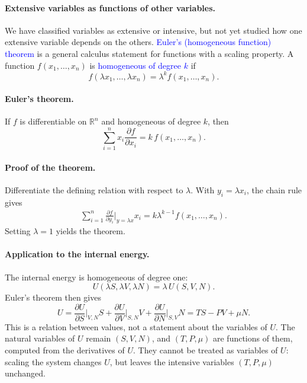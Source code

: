 \paragraph{Extensive variables as functions of other variables.}
We have classified variables as extensive or intensive, but not yet studied
how one extensive variable depends on the others. \textcolor{blue}{Euler's
(homogeneous function) theorem} is a general calculus statement for functions
with a scaling property. A function $f(x_1,\ldots,x_n)$ is
\textcolor{blue}{homogeneous of degree $k$} if
\begin{equation}
    \boxed{f(\lambda x_1,\ldots,\lambda x_n)=\lambda^k f(x_1,\ldots,x_n).}
\end{equation}

\paragraph{Euler's theorem.}
If $f$ is differentiable on $\mathbb{R}^n$ and homogeneous of degree $k$, then
\begin{equation}
    \boxed{\sum_{i=1}^n x_i\frac{\partial f}{\partial x_i}=k\,f(x_1,\ldots,x_n).}
\end{equation}

\paragraph{Proof of the theorem.}
Differentiate the defining relation with respect to $\lambda$. With
$y_i=\lambda x_i$, the chain rule gives
\begin{align*}
    \sum_{i=1}^n\frac{\partial f}{\partial y_i}\bigg|_{y=\lambda x}x_i
    =k\lambda^{k-1}f(x_1,\ldots,x_n).
\end{align*}
Setting $\lambda=1$ yields the theorem.

\paragraph{Application to the internal energy.}
The internal energy is homogeneous of degree one:
\begin{equation*}
    U(\lambda S,\lambda V,\lambda N)=\lambda\,U(S,V,N).
\end{equation*}
Euler's theorem then gives
\begin{equation}
    \boxed{U=\frac{\partial U}{\partial S}\bigg|_{V,N}S
    +\frac{\partial U}{\partial V}\bigg|_{S,N}V
    +\frac{\partial U}{\partial N}\bigg|_{S,V}N=TS-PV+\mu N.}
\end{equation}
This is a relation between values, not a statement about the variables of
$U$. The natural variables of $U$ remain $(S,V,N)$, and $(T,P,\mu)$ are
functions of them, computed from the derivatives of $U$. They cannot be
treated as variables of $U$: scaling the system changes $U$, but leaves
the intensive variables $(T,P,\mu)$ unchanged.

